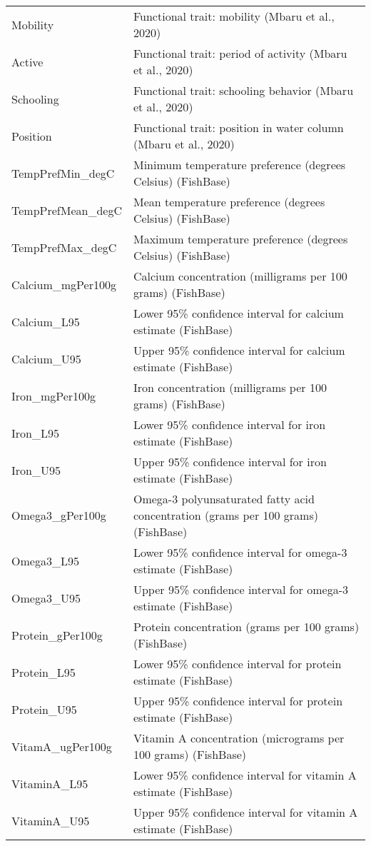 \documentclass[
]{article}
\begin{document}
\begin{longtable}[]{@{}
  >{\raggedright\arraybackslash}p{}
  >{\raggedright\arraybackslash}p{}@{}}
Mobility & Functional trait: mobility (Mbaru et al., 2020) \\
Active & Functional trait: period of activity (Mbaru et al., 2020) \\
Schooling & Functional trait: schooling behavior (Mbaru et al., 2020) \\
Position & Functional trait: position in water column (Mbaru et al.,
2020) \\
TempPrefMin\_degC & Minimum temperature preference (degrees Celsius)
(FishBase) \\
TempPrefMean\_degC & Mean temperature preference (degrees Celsius)
(FishBase) \\
TempPrefMax\_degC & Maximum temperature preference (degrees Celsius)
(FishBase) \\
Calcium\_mgPer100g & Calcium concentration (milligrams per 100 grams)
(FishBase) \\
Calcium\_L95 & Lower 95\% confidence interval for calcium estimate
(FishBase) \\
Calcium\_U95 & Upper 95\% confidence interval for calcium estimate
(FishBase) \\
Iron\_mgPer100g & Iron concentration (milligrams per 100 grams)
(FishBase) \\
Iron\_L95 & Lower 95\% confidence interval for iron estimate
(FishBase) \\
Iron\_U95 & Upper 95\% confidence interval for iron estimate
(FishBase) \\
Omega3\_gPer100g & Omega-3 polyunsaturated fatty acid concentration
(grams per 100 grams) (FishBase) \\
Omega3\_L95 & Lower 95\% confidence interval for omega-3 estimate
(FishBase) \\
Omega3\_U95 & Upper 95\% confidence interval for omega-3 estimate
(FishBase) \\
Protein\_gPer100g & Protein concentration (grams per 100 grams)
(FishBase) \\
Protein\_L95 & Lower 95\% confidence interval for protein estimate
(FishBase) \\
Protein\_U95 & Upper 95\% confidence interval for protein estimate
(FishBase) \\
VitamA\_ugPer100g & Vitamin A concentration (micrograms per 100 grams)
(FishBase) \\
VitaminA\_L95 & Lower 95\% confidence interval for vitamin A estimate
(FishBase) \\
VitaminA\_U95 & Upper 95\% confidence interval for vitamin A estimate
(FishBase) \\

\end{longtable}
\end{document}
